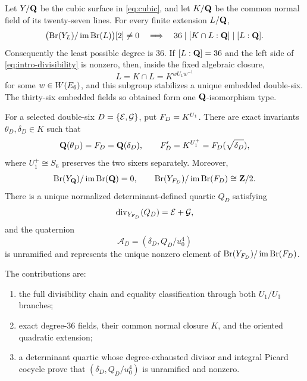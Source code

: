 \begin{theorem}
\label{thm:main}
Let \(Y/\mathbf Q\) be the cubic surface in \cref{eq:cubic}, and let \(K/\mathbf Q\) be
the common normal field of its twenty-seven lines.  For every finite extension
\(L/\mathbf Q\),
\begin{equation}
 \bigl(\operatorname{Br}(Y_{L})/\operatorname{im}\operatorname{Br}(L)\bigr)[2]\ne0
 \quad\Longrightarrow\quad
 36\mid[K\cap L:\mathbf Q]\mid[L:\mathbf Q].
\label{eq:intro-divisibility}
\end{equation}
Consequently the least possible degree is \(36\).  If
\([L:\mathbf Q]=36\) and the left side of \cref{eq:intro-divisibility} is nonzero,
then, inside the fixed algebraic closure,
\[
 L=K\cap L=K^{wU_1w^{-1}}
\]
for some \(w\in W(E_6)\), and this subgroup stabilizes a unique embedded
double-six.  The thirty-six embedded
fields so obtained form one \(\mathbf Q\)-isomorphism type.

For a selected double-six \(D=\{\mathcal E,\mathcal G\}\), put
\(F_D=K^{U_1}\).  There are exact invariants
\(\theta_D,\delta_D\in K\) such that
\[
 \mathbf Q(\theta_D)=F_D=\mathbf Q(\delta_D),\qquad
 F_D'=K^{U_1^+}=F_D(\sqrt{\delta_D}),
\]
where \(U_1^+\cong S_6\) preserves the two sixers separately.  Moreover,
\[
 \operatorname{Br}(Y_{\mathbf Q})/\operatorname{im}\operatorname{Br}(\mathbf Q)=0,\qquad \operatorname{Br}(Y_{F_D})/\operatorname{im}\operatorname{Br}(F_D)\cong\mathbf Z/2.
\]
There is a unique normalized determinant-defined quartic \(Q_D\) satisfying
\[
 \operatorname{div}_{Y_{F_D}}(Q_D)=\mathcal E+\mathcal G,
\]
and the quaternion
\[
 \mathcal A_D=(\delta_D,Q_D/u_0^4)
\]
is unramified and represents the unique nonzero element of \(\operatorname{Br}(Y_{F_D})/\operatorname{im}\operatorname{Br}(F_D)\).
\end{theorem}

The contributions are:
\begin{enumerate}[leftmargin=*]
\item the full divisibility chain and equality classification through both
      \(U_1/U_3\) branches;
\item exact degree-\(36\) fields, their common normal closure \(K\), and the
      oriented quadratic extension;
\item a determinant quartic whose degree-exhausted divisor and integral
      Picard cocycle prove that \((\delta_D,Q_D/u_0^4)\) is unramified and
      nonzero.
\end{enumerate}

